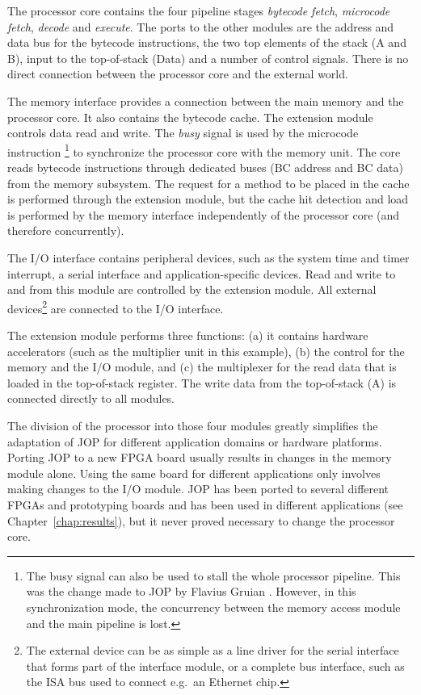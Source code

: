 The processor core contains the four pipeline stages \emph{bytecode
fetch}, \emph{microcode fetch}, \emph{decode} and \emph{execute}.
The ports to the other modules are the address and data bus for the
bytecode instructions, the two top elements of the stack (A and B),
input to the top-of-stack (Data) and a number of control signals.
There is no direct connection between the processor core and the
external world.

The memory interface provides a connection between the main memory
and the processor core. It also contains the bytecode cache. The
extension module controls data read and write. The \emph{busy}
signal is used by the microcode instruction \footnote{The
busy signal can also be used to stall the whole processor pipeline.
This was the change made to JOP by Flavius Gruian \cite{jop:sac05}.
However, in this synchronization mode, the concurrency between the
memory access module and the main pipeline is lost.} to synchronize
the processor core with the memory unit. The core reads bytecode
instructions through dedicated buses (BC address and BC data) from
the memory subsystem. The request for a method to be placed in the
cache is performed through the extension module, but the cache hit
detection and load is performed by the memory interface
independently of the processor core (and therefore concurrently).

The I/O interface contains peripheral devices, such as the system
time and timer interrupt, a serial interface and
application-specific devices. Read and write to and from this module
are controlled by the extension module. All external
devices\footnote{The external device can be as simple as a line
driver for the serial interface that forms part of the interface
module, or a complete bus interface, such as the ISA bus used to
connect e.g.\ an Ethernet chip.} are connected to the I/O interface.

The extension module performs three functions: (a) it contains
hardware accelerators (such as the multiplier unit in this example),
(b) the control for the memory and the I/O module, and (c) the
multiplexer for the read data that is loaded in the top-of-stack
register. The write data from the top-of-stack (A) is connected
directly to all modules.

The division of the processor into those four modules greatly
simplifies the adaptation of JOP for different application domains
or hardware platforms. Porting JOP to a new FPGA board usually
results in changes in the memory module alone. Using the same board
for different applications only involves making changes to the I/O
module. JOP has been ported to several different FPGAs and
prototyping boards and has been used in different applications (see
Chapter~\ref{chap:results}), but it never proved necessary to change
the processor core.


